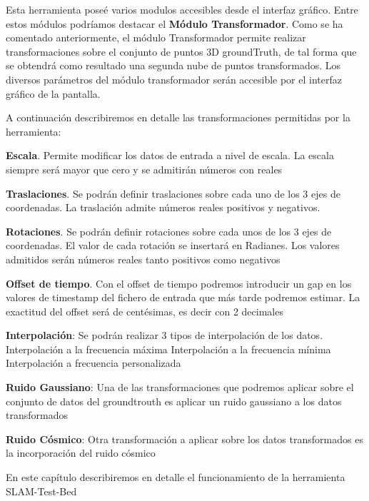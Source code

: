 Esta herramienta poseé varios modulos accesibles desde el interfaz gráfico. Entre estos módulos podríamos destacar el \textbf{Módulo Transformador}.
Como se ha comentado anteriormente, el módulo Transformador permite realizar transformaciones sobre el conjunto de puntos 3D groundTruth, de tal forma que se obtendrá como resultado una segunda nube de puntos transformados.
Los diversos parámetros del módulo transformador serán accesible por el interfaz gráfico de la pantalla.

A continuación describiremos en detalle las transformaciones permitidas por la herramienta:

\textbf{Escala}. Permite modificar los datos de entrada a nivel de escala. La escala siempre será mayor que cero y se admitirán números con reales

\textbf{Traslaciones}. Se podrán definir traslaciones sobre cada uno de los 3 ejes de coordenadas. 
La traslación admite números reales positivos y negativos.

\textbf{Rotaciones}. Se podrán definir rotaciones sobre cada unos de los 3 ejes de coordenadas. El valor de cada rotación se insertará en Radianes. Los valores admitidos serán números reales tanto positivos como negativos

\textbf{Offset de tiempo}. Con el offset de tiempo podremos introducir un gap en los valores de timestamp del fichero de entrada que más tarde podremos estimar. La exactitud del offset será de centésimas, es decir con 2 decimales

\textbf{Interpolación}: Se podrán realizar 3 tipos de interpolación de los datos.
	Interpolación a la frecuencia máxima
	Interpolación a la frecuencia mínima
	Interpolación a frecuencia personalizada

\textbf{Ruido Gaussiano}: Una de las transformaciones que podremos aplicar sobre el conjunto de datos del groundtrouth es aplicar un ruido gaussiano a los datos transformados

\textbf{Ruido Cósmico}: Otra transformación a aplicar sobre los datos transformados es la incorporación del ruido cósmico


En este capítulo describiremos en detalle el funcionamiento de la herramienta SLAM-Test-Bed

